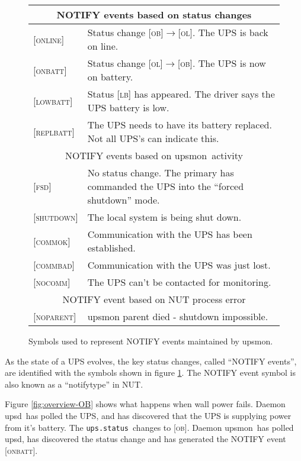 \documentclass[12pt]{article}
\newcommand{\upsd}{\mbox{\textcolor{UPSDCOLOUR}{upsd}}}
\newcommand{\upsmon}{\mbox{\textcolor{MONCOLOUR}{upsmon}}}
\newcommand{\FSDev}{\textcolor{MONCOLOUR}{\textsc{fsd}}}
\newcommand{\LB}{\textcolor{UPSDCOLOUR}{\textsc{lb}}}
\newcommand{\OB}{\textcolor{UPSDCOLOUR}{\textsc{ob}}}
\newcommand{\OL}{\textcolor{UPSDCOLOUR}{\textsc{ol}}}
\newcommand{\ONLINE}{\textcolor{MONCOLOUR}{\textsc{online}}}
\newcommand{\ONBATT}{\textcolor{MONCOLOUR}{\textsc{onbatt}}}
\newcommand{\LOWBATT}{\textcolor{MONCOLOUR}{\textsc{lowbatt}}}
\newcommand{\COMMOK}{\textcolor{MONCOLOUR}{\textsc{commok}}}
\newcommand{\COMMBAD}{\textcolor{MONCOLOUR}{\textsc{commbad}}}
\newcommand{\SHUTDOWN}{\textcolor{MONCOLOUR}{\textsc{shutdown}}}
\newcommand{\REPLBATT}{\textcolor{MONCOLOUR}{\textsc{replbatt}}}
\newcommand{\NOCOMM}{\textcolor{MONCOLOUR}{\textsc{nocomm}}}
\newcommand{\NOPARENT}{\textcolor{NUTCOLOUR}{\textsc{noparent}}}
\newcommand{\status}[1]{\textcolor{UPSDCOLOUR}{[{#1}]}}
\newcommand{\statuschange}[2]{\status{#1}{\allowbreak}\textcolor{UPSDCOLOUR}{$\rightarrow$}{\allowbreak}\status{#2}}
\newcommand{\NOTev}[1]{\textcolor{MONCOLOUR}{[{#1}]}}
\newcommand{\upsstatus}{\textcolor{UPSDCOLOUR}{\texttt{ups{\allowbreak}.status}}}
\begin{document}
\begin{figure}[ht]
\begin{center}
\begin{tabular}{|l|p{0.75\LinePrinterwidth}|}
\hline
\multicolumn{2}{|c|}{NOTIFY events based on status changes} \\ \hline
\NOTev{\ONLINE}   & Status change \statuschange{\OB}{\OL}.  The UPS is back on line. \\ \hline
\NOTev{\ONBATT}   & Status change \statuschange{\OL}{\OB}.  The UPS is now on battery. \\ \hline
\NOTev{\LOWBATT}  & Status \status{\LB} has appeared. The driver says the UPS battery is low. \\ \hline
\NOTev{\REPLBATT} & The UPS needs to have its battery replaced.  Not all UPS's can indicate this. \\ \hline\hline
\multicolumn{2}{|c|}{NOTIFY events based on \upsmon\ activity} \\ \hline
\NOTev{\FSDev}    & No status change.  The primary has commanded the UPS into the ``forced shutdown'' mode. \\ \hline
\NOTev{\SHUTDOWN} & The local system is being shut down. \\ \hline
\NOTev{\COMMOK}   & Communication with the UPS has been established. \\ \hline
\NOTev{\COMMBAD}  & Communication with the UPS was just lost. \\ \hline
\NOTev{\NOCOMM}   & The UPS can't be contacted for monitoring. \\ \hline\hline
\multicolumn{2}{|c|}{NOTIFY event based on NUT process error} \\ \hline
\NOTev{\NOPARENT} & upsmon parent died - shutdown impossible. \\ \hline
\end{tabular}
\caption{Symbols used to represent NOTIFY events maintained by \upsmon.\label{fig:NOTIFYevents}}
\end{center}
\end{figure}

As the state of a UPS evolves, the key status changes, called ``NOTIFY
events'', are identified with the symbols shown in figure
\ref{fig:NOTIFYevents}.  The NOTIFY event symbol is also known as a
``notifytype'' in NUT.

Figure \ref{fig:overview-OB} shows what happens when wall power fails.  Daemon
\upsd\ has polled the UPS, and has discovered that the UPS is supplying power
from it's battery.  The \upsstatus\ changes to \status{\OB}.  Daemon
\upsmon\ has polled \upsd, has discovered the status change and has generated
the NOTIFY event \NOTev{\ONBATT}.
\end{document}
